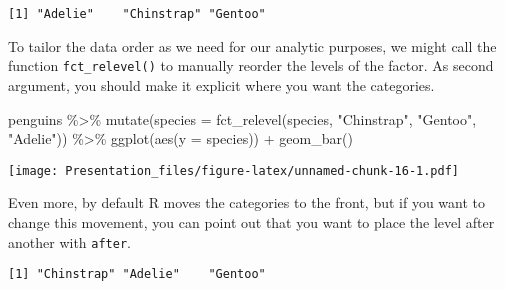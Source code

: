 \documentclass[
]{article}
\newenvironment{Shaded}{\begin{snugshade}}{\end{snugshade}}
\newcommand{\AttributeTok}[1]{\textcolor[rgb]{0.77,0.63,0.00}{#1}}
\newcommand{\DecValTok}[1]{\textcolor[rgb]{0.00,0.00,0.81}{#1}}
\newcommand{\FunctionTok}[1]{\textcolor[rgb]{0.00,0.00,0.00}{#1}}
\newcommand{\NormalTok}[1]{#1}
\newcommand{\SpecialCharTok}[1]{\textcolor[rgb]{0.00,0.00,0.00}{#1}}
\newcommand{\StringTok}[1]{\textcolor[rgb]{0.31,0.60,0.02}{#1}}
\begin{document}
\begin{verbatim}
[1] "Adelie"    "Chinstrap" "Gentoo"   
\end{verbatim}

To tailor the data order as we need for our analytic purposes, we might
call the function \texttt{fct\_relevel()} to manually reorder the levels
of the factor. As second argument, you should make it explicit where you
want the categories.

\begin{Shaded}
\begin{Highlighting}[]
\NormalTok{penguins }\SpecialCharTok{\%\textgreater{}\%}
  \FunctionTok{mutate}\NormalTok{(}\AttributeTok{species =} \FunctionTok{fct\_relevel}\NormalTok{(species, }\StringTok{"Chinstrap"}\NormalTok{, }\StringTok{"Gentoo"}\NormalTok{, }\StringTok{"Adelie"}\NormalTok{)) }\SpecialCharTok{\%\textgreater{}\%}
  \FunctionTok{ggplot}\NormalTok{(}\FunctionTok{aes}\NormalTok{(}\AttributeTok{y =}\NormalTok{ species)) }\SpecialCharTok{+}
  \FunctionTok{geom\_bar}\NormalTok{()}
\end{Highlighting}
\end{Shaded}

\texttt{[image: Presentation\_files/figure-latex/unnamed-chunk-16-1.pdf]}

Even more, by default R moves the categories to the front, but if you
want to change this movement, you can point out that you want to place
the level after another with \texttt{after}.

\begin{Shaded}
\end{Shaded}

\begin{verbatim}
[1] "Chinstrap" "Adelie"    "Gentoo"   
\end{verbatim}

\begin{Shaded}
\end{Shaded}
\end{document}
